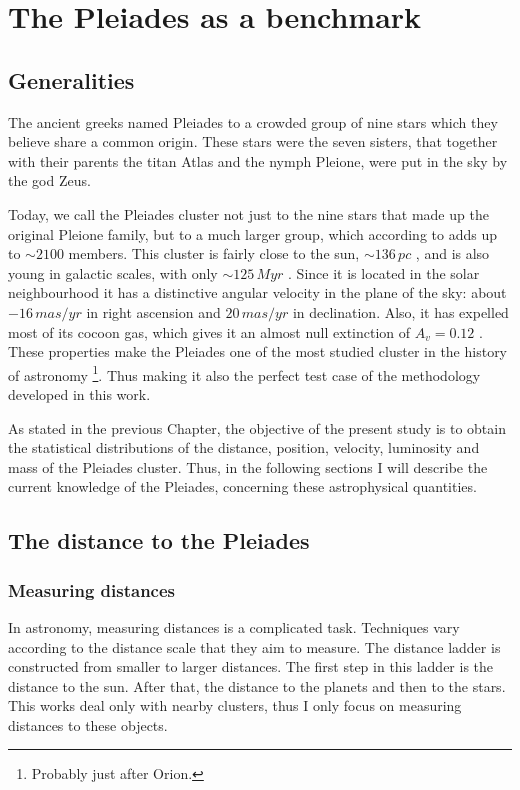\chapter{The Pleiades as a benchmark}
\label{chap:pleiades}

\section{Generalities}
The ancient greeks named Pleiades to a crowded group of nine stars which they believe share a common origin. These stars were the seven sisters, that together with their parents the titan Atlas and the nymph Pleione, were put in the sky  by the god Zeus.
 
Today, we call the Pleiades cluster not just to the nine stars that made up the original Pleione family, but to a much larger group, which according to \citet{Bouy2015} adds up to $\sim2100$ members. This cluster is fairly close to the sun, $\sim 136\,pc$ \cite[according to][]{Galli2017}, and is also young in galactic scales, with only $\sim125\,Myr$ \citep{Stauffer1998}. Since it is located in the solar neighbourhood it has a distinctive angular velocity in the plane of the sky: about $-16\,mas/yr$ in right ascension and $20\,mas/yr$ in declination. Also, it has expelled most of its cocoon gas, which gives it an almost null extinction of $A_v=0.12$ \citep{Guthrie1987}. These properties make the Pleiades one of the most studied cluster in the history of astronomy \footnote{Probably just after Orion.}. Thus making it also the perfect test case of the methodology developed in this work.

As stated in the previous Chapter,  the objective of the present study is to obtain the statistical distributions of the distance, position, velocity, luminosity and mass of the Pleiades cluster. Thus, in the following sections I will describe the current knowledge of the Pleiades, concerning these astrophysical quantities. 
 
\section{The distance to the Pleiades}

\subsection{Measuring distances}
In astronomy, measuring distances is a complicated task. Techniques vary according to the distance scale that they aim to measure. The distance ladder is constructed from smaller to larger distances. The first step in this ladder is the distance to the sun. After that, the distance to the planets and then to the stars. This works deal only with nearby clusters, thus I only focus on measuring distances to these objects. 

